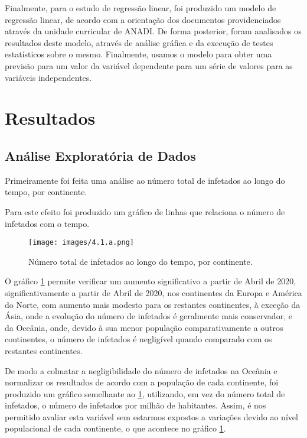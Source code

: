 \documentclass[conference]{IEEEtran}
\begin{document}
Finalmente, para o estudo de regressão linear, foi produzido um modelo de regressão linear, de acordo com a orientação dos documentos providenciados através da unidade curricular de ANADI. De forma posterior, foram analisados os resultados deste modelo, através de análise gráfica e da execução de testes estatísticos sobre o mesmo. Finalmente, usamos o modelo para obter uma previsão para um valor da variável dependente para um série de valores para as variáveis independentes.

\section{Resultados}

\subsection{Análise Exploratória de Dados}

Primeiramente foi feita uma análise ao número total de infetados ao longo do tempo, por continente.

Para este efeito foi produzido um gráfico de linhas que relaciona o número de infetados com o tempo.

\begin{figure}[h]
    \centering
    \texttt{[image: images/4.1.a.png]}
    \caption{Número total de infetados ao longo do tempo, por continente.}
    \label{fig:4.1.a}
\end{figure}

O gráfico \ref{fig:4.1.a} permite verificar um aumento significativo a partir de Abril de 2020,  significativamente a partir de Abril de 2020, nos continentes da Europa e América do Norte, com aumento mais modesto para os restantes continentes, à exceção da Ásia, onde a evolução do número de infetados é geralmente mais conservador, e da Oceânia, onde, devido à sua menor população comparativamente a outros continentes, o número de infetados é negligível quando comparado com os restantes continentes.

De modo a colmatar a negligibilidade do número de infetados na Oceânia e normalizar os resultados de acordo com a população de cada continente, foi produzido um gráfico semelhante ao \ref{fig:4.1.a}, utilizando, em vez do número total de infetados, o número de infetados por milhão de habitantes. Assim, é nos permitido avaliar esta variável sem estarmos expostos a variações devido ao nível populacional de cada continente, o que acontece no gráfico \ref{fig:4.1.a}.
\end{document}
